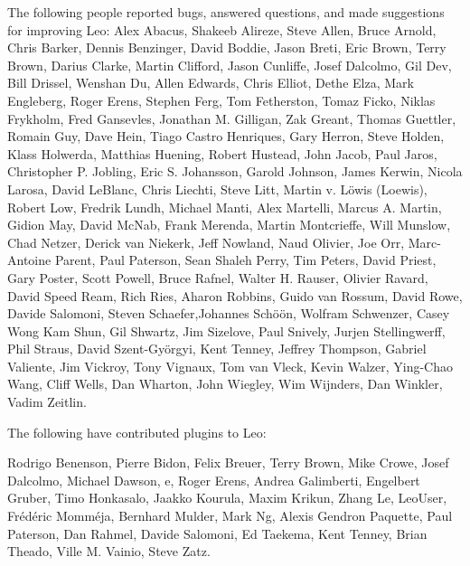 \documentclass[a4paper,10pt,english]{sphinxmanual}
\begin{document}
The following people reported bugs, answered questions, and made suggestions for
improving Leo:
Alex Abacus, Shakeeb Alireze, Steve Allen, Bruce Arnold,
Chris Barker, Dennis Benzinger, David Boddie, Jason Breti, Eric Brown, Terry Brown,
Darius Clarke, Martin Clifford, Jason Cunliffe,
Josef Dalcolmo, Gil Dev, Bill Drissel, Wenshan Du,
Allen Edwards, Chris Elliot, Dethe Elza, Mark Engleberg, Roger Erens,
Stephen Ferg, Tom Fetherston, Tomaz Ficko, Niklas Frykholm,
Fred Gansevles, Jonathan M. Gilligan, Zak Greant, Thomas Guettler, Romain Guy,
Dave Hein, Tiago Castro Henriques, Gary Herron, Steve Holden, Klass Holwerda, Matthias Huening, Robert Hustead,
John Jacob, Paul Jaros, Christopher P. Jobling, Eric S. Johansson, Garold Johnson,
James Kerwin,
Nicola Larosa, David LeBlanc, Chris Liechti, Steve Litt, Martin v. Löwis (Loewis), Robert Low, Fredrik Lundh,
Michael Manti, Alex Martelli, Marcus A. Martin, Gidion May, David McNab, Frank Merenda, Martin Montcrieffe, Will Munslow,
Chad Netzer, Derick van Niekerk, Jeff Nowland,
Naud Olivier, Joe Orr,
Marc-Antoine Parent, Paul Paterson, Sean Shaleh Perry, Tim Peters, David Priest, Gary Poster, Scott Powell,
Bruce Rafnel, Walter H. Rauser, Olivier Ravard, David Speed Ream, Rich Ries, Aharon Robbins, Guido van Rossum, David Rowe,
Davide Salomoni, Steven Schaefer,Johannes Schöön, Wolfram Schwenzer, Casey Wong Kam Shun,
Gil Shwartz, Jim Sizelove, Paul Snively, Jurjen Stellingwerff, Phil Straus, David Szent-Györgyi,
Kent Tenney, Jeffrey Thompson,
Gabriel Valiente, Jim Vickroy, Tony Vignaux, Tom van Vleck,
Kevin Walzer, Ying-Chao Wang, Cliff Wells, Dan Wharton, John Wiegley, Wim Wijnders, Dan Winkler,
Vadim Zeitlin.

The following have contributed plugins to Leo:

Rodrigo Benenson, Pierre Bidon, Felix Breuer, Terry Brown,
Mike Crowe,
Josef Dalcolmo, Michael Dawson,
e, Roger Erens,
Andrea Galimberti, Engelbert Gruber,
Timo Honkasalo,
Jaakko Kourula, Maxim Krikun,
Zhang Le, LeoUser,
Frédéric Momméja, Bernhard Mulder,
Mark Ng,
Alexis Gendron Paquette, Paul Paterson,
Dan Rahmel,
Davide Salomoni,
Ed Taekema, Kent Tenney, Brian Theado,
Ville M. Vainio,
Steve Zatz.
\end{document}
